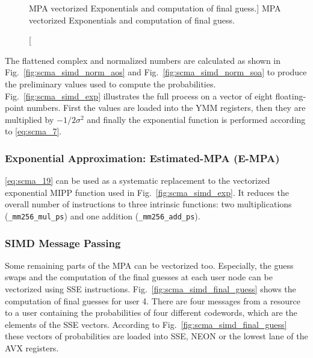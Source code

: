 \begin{figure}[htp]
{
  }
  \caption
    [MPA vectorized Exponentials and computation of final guess.]
    {MPA vectorized Exponentials and computation of final guess.}
  \label{fig:scma_simd_exp_final_guess}
\end{figure}

The flattened complex and normalized numbers are calculated as shown in
Fig.~\ref{fig:scma_simd_norm_aos} and Fig.~\ref{fig:scma_simd_norm_soa} to
produce the preliminary values used to compute the probabilities.
Fig.~\ref{fig:scma_simd_exp} illustrates the full process on a vector of
eight floating-point numbers. First the values are loaded into the YMM
registers, then they are multiplied by $-1/2\sigma^2$ and finally the
exponential function is performed according to \eqref{eq:scma_7}.

\subsubsection{Exponential Approximation: Estimated-MPA (E-MPA)}

\eqref{eq:scma_19} can be used as a systematic replacement to the vectorized
exponential MIPP function used in Fig.~\ref{fig:scma_simd_exp}. It reduces the
overall number of instructions to three intrinsic functions: two multiplications
(\verb|_mm256_mul_ps|) and one addition (\verb|_mm256_add_ps|).

\subsubsection{SIMD Message Passing}

Some remaining parts of the MPA can be vectorized too. Especially, the guess
swaps and the computation of the final guesses at each user node can be
vectorized using SSE instructions. Fig.~\ref{fig:scma_simd_final_guess} shows
the computation of final guesses for user 4. There are four messages from a
resource to a user containing the probabilities of four different codewords,
which are the elements of the SSE vectors. According to
Fig.~\ref{fig:scma_simd_final_guess} these vectors of probabilities are loaded
into SSE, NEON or the lowest lane of the AVX registers.

